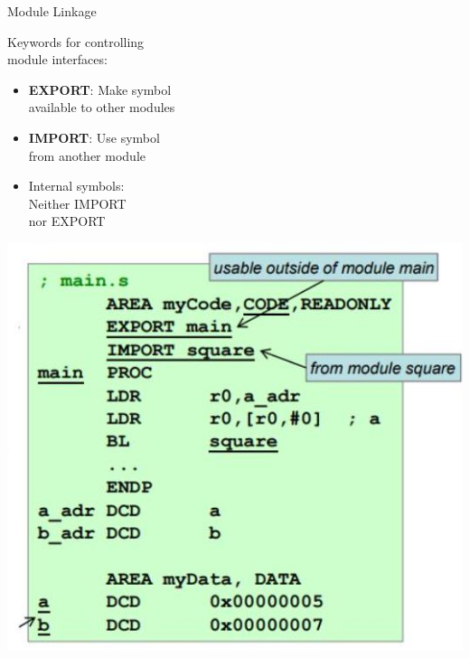 \begin{definition}{Module Linkage}

\begin{minipage}{0.44\textwidth}
  Keywords for controlling \\module interfaces:\\
  \begin{itemize}
    \item \textbf{EXPORT}: Make symbol\\ available to other modules
    \item \textbf{IMPORT}: Use symbol \\from another module
    \item Internal symbols: \\Neither IMPORT \\nor EXPORT
  \end{itemize}
\end{minipage}
\begin{minipage}{0.55\textwidth}
  \vspace{-6mm}
  \includegraphics[width=\linewidth]{images/2024_12_29_79e6b22f503fb7b4f718g-10(1)}
\end{minipage}
\end{definition}



